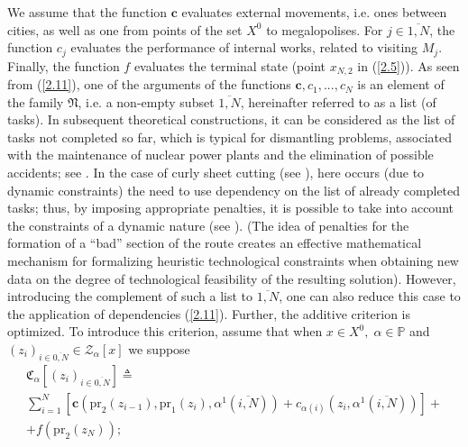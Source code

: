 We assume that the function
$\mathbf{c}$
evaluates external movements,
i.e. ones between cities,
as well as one from points of the set $ X ^ 0 $
to megalopolises.
For $j \in \overline{1,N}$,
the function $ c_j $
evaluates the performance of internal works,
related to visiting $ M_j$.
Finally, the function $ f $
evaluates the terminal state
(point $x_{N,2}$
in (\ref{2.5})).
As seen from (\ref{2.11}),
one of the arguments of the functions
$ \mathbf {c}, c_1, ..., c_N $
is an element of the family $\mathfrak{N}$,
i.e. a non-empty subset $\overline{1, N}$,
hereinafter referred to as a list (of tasks).
In subsequent theoretical constructions,
it can be considered as
the list of tasks
not completed so far,
which is typical for dismantling problems,
associated with the maintenance of nuclear power plants
and the elimination of possible accidents;
see \cite{1,3}.
In the case of curly sheet cutting
(see \cite{4}),
here occurs
(due to dynamic constraints)
the need to use dependency
on the list of already completed tasks;
thus, by imposing appropriate penalties,
it is possible to take into account the constraints of a dynamic nature
(see \cite{18}).
(The idea of penalties
for the formation of a ``bad''
section of the route
creates an effective mathematical mechanism
for formalizing heuristic technological constraints
when obtaining new data on the degree of technological feasibility
of the resulting solution).
However, introducing the complement of such a list to
$\overline{1,N}$,
one can also reduce this case to the application of dependencies
 (\ref{2.11}).
Further, the additive criterion is optimized.
To introduce this criterion, assume that
when
$x \in X^0,\;\alpha \in \mathbb{P}$
and
$(z_i)_{i \in \overline{0,N}} \in \mathcal{Z}_\alpha[x]$
we suppose
\begin{multline}\label{2.12}
\mathfrak{C}_{\alpha}[(z_i)_{i \in \overline{0,N}}] {\triangleq}
\\
\sum\limits_{i=1}^N [\mathbf{c}(\mathrm{pr}_2(z_{i-1}),\mathrm{pr}_1(z_i),\alpha^1(\overline{i,N})) +
c_{\alpha(i)}(z_i,\alpha^1(\overline{i,N}))] +
\\
+ f(\mathrm{pr}_2(z_N));
\end{multline}

